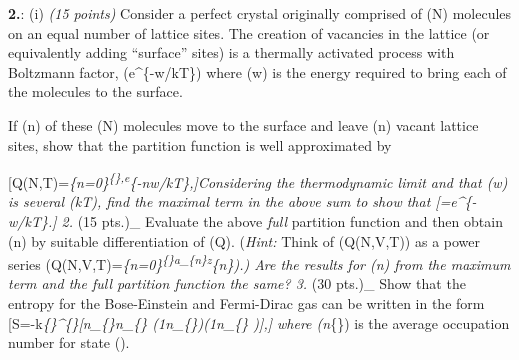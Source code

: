 \documentclass[
]{article}
\begin{document}
\textbf{2.}: (i) \emph{(15 points)} Consider a perfect crystal
originally comprised of (N) molecules on an equal number of lattice
sites. The creation of vacancies in the lattice (or equivalently adding
``surface'' sites) is a thermally activated process with Boltzmann
factor, (e\^{}\{-w/kT\}) where (w) is the energy required to bring each
of the molecules to the surface.

If (n) of these (N) molecules move to the surface and leave (n) vacant
lattice sites, show that the partition function is well approximated by

{[}Q(N,T)=\sum\emph{\{n=0\}\textsuperscript{\{\infty\},e}\{-nw/kT\},{]}Considering
the thermodynamic limit and that (w) is several (kT), find the maximal
term in the above sum to show that {[}=e\^{}\{-w/kT\}.{]}
2. }(15 pts.)\_ Evaluate the above \emph{full} partition function and
then obtain (\langle n\rangle) by suitable differentiation of (\log Q).
(\emph{Hint:} Think of (Q(N,V,T)) as a power series
(Q(N,V,T)=\sum\emph{\{n=0\}\textsuperscript{\{\infty\}a\_\{n\}z}\{n\}).)
Are the results for (\langle n\rangle) from the maximum term and the
full partition function the same? 3. }(30 pts.)\_ Show that the entropy
for the Bose-Einstein and Fermi-Dirac gas can be written in the form
{[}S=-k\sum\emph{\{\}\^{}\{\infty\}{[}\langle n\_\{\alpha\}\rangle\ln\langle n\_\{\alpha\}
\rangle\mp(1\pm\langle n\_\{\alpha\}\rangle)\ln\left(1\pm\langle n\_\{\alpha\}
\rangle\right){]},{]} where (\langle n}\{\alpha\}\rangle) is the average
occupation number for state (\alpha).
\end{document}
